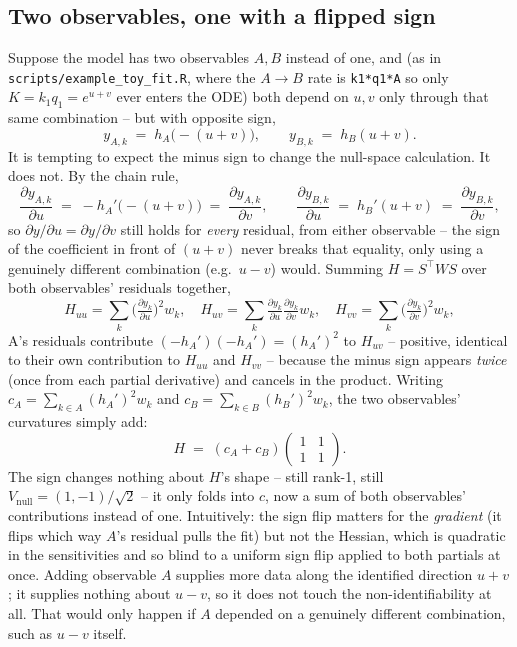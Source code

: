 \documentclass[11pt]{article}
\newcommand{\code}[1]{\texttt{#1}}
\newcommand{\file}[1]{\textcolor{black!60}{\texttt{#1}}}
\begin{document}
\subsection*{Two observables, one with a flipped sign}

Suppose the model has two observables $A,B$ instead of one, and (as in
\file{scripts/example\_toy\_fit.R}, where the $A\to B$ rate is
\code{k1*q1*A} so only $K=k_1q_1=e^{u+v}$ ever enters the ODE) both depend on
$u,v$ only through that same combination -- but with opposite sign,
\begin{equation}
  y_{A,k} \;=\; h_A\big({-}(u+v)\big), \qquad y_{B,k} \;=\; h_B(u+v).
\end{equation}
It is tempting to expect the minus sign to change the null-space calculation.
It does not. By the chain rule,
\begin{equation}
  \frac{\partial y_{A,k}}{\partial u} \;=\; -h_A'\big({-}(u{+}v)\big) \;=\;
  \frac{\partial y_{A,k}}{\partial v},
  \qquad
  \frac{\partial y_{B,k}}{\partial u} \;=\; h_B'(u{+}v) \;=\; \frac{\partial y_{B,k}}{\partial v},
\end{equation}
so $\partial y/\partial u=\partial y/\partial v$ still holds for \emph{every}
residual, from either observable -- the sign of the coefficient in front of
$(u+v)$ never breaks that equality, only using a genuinely different
combination (e.g.\ $u-v$) would. Summing $H=S^\top WS$ over both observables'
residuals together,
\begin{equation}
  H_{uu} = \sum_k\Big(\tfrac{\partial y_k}{\partial u}\Big)^{\!2}w_k, \quad
  H_{uv} = \sum_k\tfrac{\partial y_k}{\partial u}\tfrac{\partial y_k}{\partial v}w_k, \quad
  H_{vv} = \sum_k\Big(\tfrac{\partial y_k}{\partial v}\Big)^{\!2}w_k,
\end{equation}
A's residuals contribute $(-h_A')(-h_A')=(h_A')^2$ to $H_{uv}$ -- positive,
identical to their own contribution to $H_{uu}$ and $H_{vv}$ -- because the
minus sign appears \emph{twice} (once from each partial derivative) and
cancels in the product. Writing $c_A=\sum_{k\in A}(h_A')^2w_k$ and
$c_B=\sum_{k\in B}(h_B')^2w_k$, the two observables' curvatures simply add:
\begin{equation}
  H \;=\; (c_A+c_B)\begin{pmatrix}1&1\\1&1\end{pmatrix}.
\end{equation}
The sign changes nothing about $H$'s shape -- still rank-1, still
$V_{\mathrm{null}}=(1,-1)/\sqrt2$ -- it only folds into $c$, now a sum of both
observables' contributions instead of one. Intuitively: the sign flip matters
for the \emph{gradient} (it flips which way $A$'s residual pulls the fit) but
not the Hessian, which is quadratic in the sensitivities and so blind to a
uniform sign flip applied to both partials at once. Adding observable $A$
supplies more data along the identified direction $u+v$; it supplies nothing
about $u-v$, so it does not touch the non-identifiability at all. That would
only happen if $A$ depended on a genuinely different combination, such as
$u-v$ itself.
\end{document}
